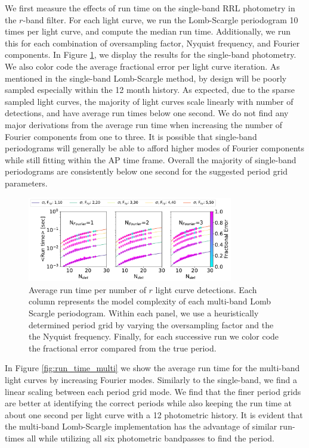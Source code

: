 \documentclass[DM,authoryear,toc]{lsstdoc}
\begin{document}
We first measure the effects of run time on the single-band RRL photometry in the $r$-band filter.
For each light curve, we run the Lomb-Scargle periodogram 10 times per light curve, and compute the median run time.
Additionally, we run this for each combination of oversampling factor, Nyquist frequency, and Fourier components.
In Figure \ref{fig:run_time_single}, we display the results for the single-band photometry.
We also color code the average fractional error per light curve iteration.
As mentioned in the single-band Lomb-Scargle method, by design will be poorly sampled especially within the 12 month history.
As expected, due to the sparse sampled light curves, the majority of light curves scale linearly with number of detections, and have average run times below one second.
We do not find any major derivations from the average run time when increasing the number of Fourier components from one to three.
It is possible that single-band periodograms will generally be able to afford higher modes of Fourier components while still fitting within the AP time frame.
Overall the majority of single-band periodograms are consistently below one second for the suggested period grid parameters.

\begin{figure}
\includegraphics[width=0.8\textwidth]{figures/singleRUN_LSP_RRL.pdf}
\centering 
\caption{Average run time per number of $r$ light curve detections.
Each column represents the model complexity of each multi-band Lomb Scargle periodogram.
Within each panel, we use a heuristically determined period grid by varying the oversampling factor and the the Nyquist frequency.
 Finally, for each successive run we color code the fractional error compared from the true period.}
  \label{fig:run_time_single}
\end{figure}

In Figure \ref{fig:run_time_multi} we show the average run time for the multi-band light curves by increasing Fourier modes.
Similarly to the single-band, we find a linear scaling between each period grid mode.
We find that the finer period grids are better at identifying the correct periods while also keeping the run time at about one second per light curve with a 12 photometric history.
It is evident that the multi-band Lomb-Scargle implementation has the advantage of similar run-times all while utilizing all six photometric bandpasses to find the period.
\end{document}
